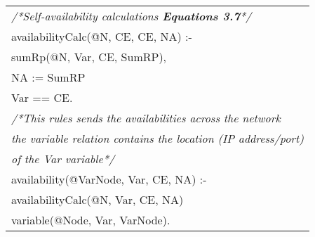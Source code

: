 \documentclass[letterpaper,twocolumn,11pt]{article}
\begin{document}
\begin{tabular}{|l|}
\scriptsize{\textit{/*Self-availability calculations \textbf{Equations 3.7}*/}}\\
\scriptsize{availabilityCalc(@N, CE, CE, NA) :-}\\
\scriptsize{ \hspace{0.5cm}        sumRp(@N, Var, CE, SumRP),}\\
\scriptsize{ \hspace{0.5cm}         NA := SumRP}\\
\scriptsize{ \hspace{0.5cm}         Var == CE.}\\

\scriptsize{\textit{/*This rules sends the availabilities across the network}}\\
\scriptsize{\textit{the variable relation contains the location (IP address/port)}}\\
\scriptsize{\textit{of the Var variable*/}}\\
\scriptsize{availability(@VarNode, Var, CE, NA)  :-}\\
\scriptsize{ \hspace{0.5cm}         availabilityCalc(@N, Var, CE, NA)}\\
\scriptsize{ \hspace{0.5cm}         variable(@Node, Var, VarNode).}\\
\hline
\end{tabular}
\newpage
\end{document}
